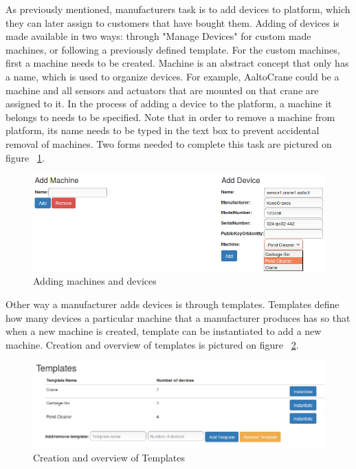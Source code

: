 As previously mentioned, manufacturers task is to add devices to platform, which they can later assign to customers that have bought them. Adding of devices is made available in two ways: through "Manage Devices" for custom made machines, or following a previously defined template. For the custom machines, first a machine needs to be created. Machine is an abstract concept that only has a name, which is used to organize devices. For example, AaltoCrane could be a machine and all sensors and actuators that are mounted on that crane are assigned to it. In the process of adding a device to the platform, a machine it belongs to needs to be specified. Note that in order to remove a machine from platform, its name needs to be typed in the text box to prevent accidental removal of machines. Two forms needed to complete this task are pictured on figure ~\ref{fig:AddMachineDevice}. 

\begin{figure}[ht]
	\begin{center}
		\includegraphics[width=\textwidth]{images/implementation/AddMachineDevice}
		\caption{Adding machines and devices}
		\label{fig:AddMachineDevice}
	\end{center}
\end{figure}

Other way a manufacturer adds devices is through templates. Templates define how many devices a particular machine that a manufacturer produces has so that when a new machine is created, template can be instantiated to add a new machine. Creation and overview of templates is pictured on figure ~\ref{fig:addTemplate}. 

\begin{figure}[ht]
	\begin{center}
		\includegraphics[width=\textwidth]{images/implementation/AddTemplate}
		\caption{Creation and overview of Templates}
		\label{fig:addTemplate}
	\end{center}
\end{figure}


